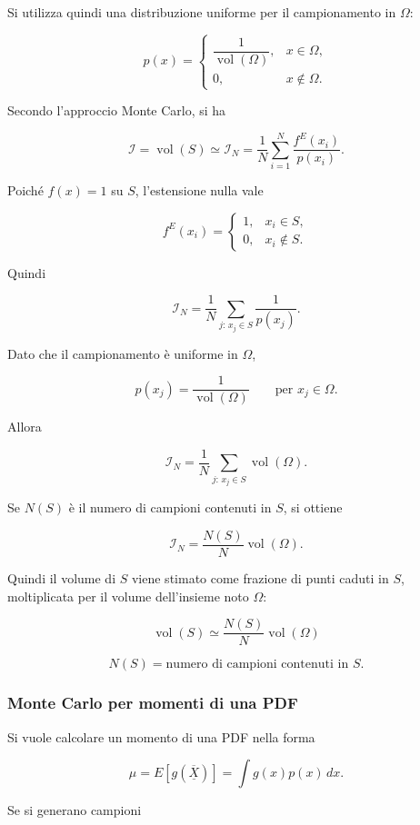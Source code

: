 \documentclass[11pt,a4paper]{article}
\begin{document}
Si utilizza quindi una distribuzione uniforme per il campionamento in \(\Omega\):

\[
p(x)=
\begin{cases}
\dfrac{1}{\operatorname{vol}(\Omega)}, & x\in \Omega,\\[0.8em]
0, & x\notin \Omega.
\end{cases}
\]

Secondo l'approccio Monte Carlo, si ha

\[
\mathcal{I}
=
\operatorname{vol}(S)
\simeq
\mathcal{I}_N
=
\frac{1}{N}\sum_{i=1}^{N}
\frac{f^E(x_i)}{p(x_i)}.
\]

Poiché \(f(x)=1\) su \(S\), l'estensione nulla vale

\[
f^E(x_i)=
\begin{cases}
1, & x_i\in S,\\
0, & x_i\notin S.
\end{cases}
\]

Quindi

\[
\mathcal{I}_N
=
\frac{1}{N}
\sum_{j:\,x_j\in S}
\frac{1}{p(x_j)}.
\]

Dato che il campionamento è uniforme in \(\Omega\),

\[
p(x_j)=\frac{1}{\operatorname{vol}(\Omega)}
\qquad
\text{per } x_j\in \Omega.
\]

Allora

\[
\mathcal{I}_N
=
\frac{1}{N}
\sum_{j:\,x_j\in S}
\operatorname{vol}(\Omega).
\]

Se \(N(S)\) è il numero di campioni contenuti in \(S\), si ottiene

\[
\mathcal{I}_N
=
\frac{N(S)}{N}\operatorname{vol}(\Omega).
\]

Quindi il volume di \(S\) viene stimato come frazione di punti caduti in \(S\), moltiplicata per il volume dell'insieme noto \(\Omega\):

\[
\boxed{
\operatorname{vol}(S)
\simeq
\frac{N(S)}{N}\operatorname{vol}(\Omega)
}
\]

\[
N(S)=\text{numero di campioni contenuti in }S.
\]

\subsubsection*{Monte Carlo per momenti di una PDF}

Si vuole calcolare un momento di una PDF nella forma

\[
\mu = E[g(\overline{\underline{X}})] = \int g(x)p(x)\,dx.
\]

Se si generano campioni
\end{document}
